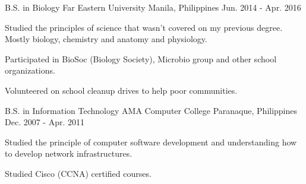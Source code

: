 
\begin{cventries}
    \cventry
        {B.S. in Biology}
        {Far Eastern University}
        {Manila, Philippines}
        {Jun. 2014 - Apr. 2016}
        {
          \begin{cvitems}
            \item {Studied the principles of science that wasn't covered on my previous degree. Mostly biology, chemistry and anatomy and physiology.}
            \item {Participated in BioSoc (Biology Society), Microbio group and other school organizations.}
            \item {Volunteered on school cleanup drives to help poor communities.}
          \end{cvitems}
        }
        
    \cventry
        {B.S. in Information Technology}
        {AMA Computer College}
        {Paranaque, Philippines}
        {Dec. 2007 - Apr. 2011}
        {
          \begin{cvitems}
            \item {Studied the principle of computer software development and understanding how to develop network infrastructures.}
            \item {Studied Cisco (CCNA) certified courses.}
          \end{cvitems}
        }

\end{cventries}